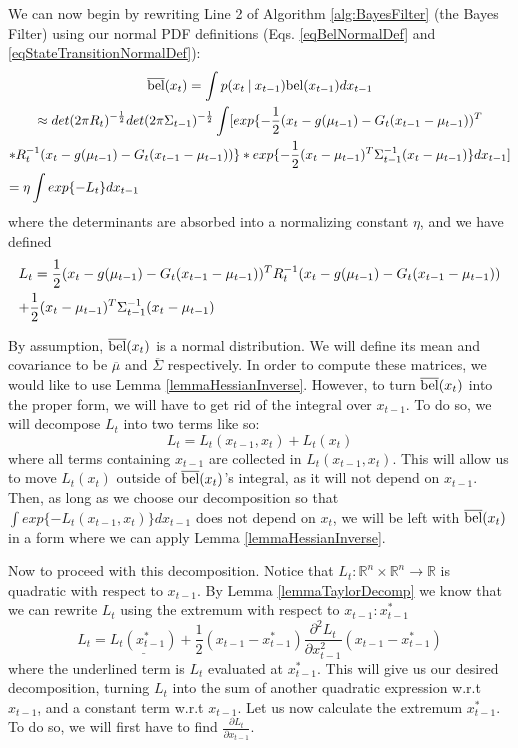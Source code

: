 We can now begin by rewriting Line 2 of Algorithm \ref{alg:BayesFilter} (the Bayes Filter) using our normal PDF definitions (Eqs. \ref{eqBelNormalDef} and \ref{eqStateTransitionNormalDef}):
\begin{multline} \label{eqBelBarLt}
\overline{\bel}(x_t) = \int p(x_t \mathbin{\vert} x_{t-1}) \bel(x_{t-1})dx_{t-1} \\
\approx det(2 \pi R_t)^{-\frac{1}{2}} det(2 \pi \Sigma_{t-1})^{-\frac{1}{2}} \int [ exp\{-\frac{1}{2} (x_t - g(\mu_{t-1}) - G_t (x_{t-1} - \mu_{t-1}))^T \\ * R_t^{-1} (x_t - g(\mu_{t-1}) - G_t (x_{t-1} - \mu_{t-1}))\} * exp \{-\frac{1}{2} (x_t - \mu_{t-1})^T \Sigma_{t-1}^{-1} (x_t - \mu_{t-1}) \}dx_{t-1} ] \\
= \eta \int exp\{-L_t\}dx_{t-1} \hfill
\end{multline}
where the determinants are absorbed into a normalizing constant \(\eta\), and we have defined
\begin{multline}
L_t = \frac{1}{2} (x_t - g(\mu_{t-1}) - G_t (x_{t-1} - \mu_{t-1}))^T R_t^{-1} (x_t - g(\mu_{t-1}) - G_t (x_{t-1} - \mu_{t-1}))\\
+ \frac{1}{2} (x_t - \mu_{t-1})^T \Sigma_{t-1}^{-1} (x_t - \mu_{t-1}) \hfill
\end{multline}

By assumption, \(\overline{\mathrm{bel}}(x_t)\) is a normal distribution. We will define its mean and covariance to be \(\overline{\mu}\) and \(\overline{\Sigma}\) respectively. In order to compute these matrices, we would like to use Lemma \ref{lemmaHessianInverse}. However, to turn \(\overline{\mathrm{bel}}(x_t)\) into the proper form, we will have to get rid of the integral over \(x_{t-1}\). To do so, we will decompose \(L_t\) into two terms like so: \begin{equation} \label{eqLtDecomp}
L_t = L_t(x_{t-1},x_t) + L_t(x_t)
\end{equation}
where all terms containing \(x_{t-1}\) are collected in \(L_t(x_{t-1},x_t)\). This will allow us to move \(L_t(x_t)\) outside of \(\overline{\mathrm{bel}}(x_t)\)'s integral, as it will not depend on \(x_{t-1}\). Then, as long as we choose our decomposition so that \(\int exp\{ -L_t(x_{t-1},x_t)\}dx_{t-1}\) does not depend on \(x_t\), we will be left with \(\overline{\mathrm{bel}}(x_t)\) in a form where we can apply Lemma \ref{lemmaHessianInverse}.

Now to proceed with this decomposition. Notice that \(L_t : \mathbb{R}^n \times \mathbb{R}^n \to \mathbb{R}\) is quadratic with respect to \(x_{t-1}\). By Lemma \ref{lemmaTaylorDecomp} we know that we can rewrite \(L_t\) using the extremum with respect to \(x_{t-1}: x_{t-1}^*\) \[
L_t = \underline{L_t(x_{t-1}^*)} + \frac{1}{2} (x_{t-1} - x_{t-1}^*) \frac{\partial^2 L_t}{\partial x_{t-1}^2} (x_{t-1} - x_{t-1}^*)
\] 
where the underlined term is \(L_t\) evaluated at \(x_{t-1}^*\). This will give us our desired decomposition, turning \(L_t\) into the sum of another quadratic expression w.r.t \(x_{t-1}\), and a constant term w.r.t \(x_{t-1}\). Let us now calculate the extremum \(x_{t-1}^*\). To do so, we will first have to find \(\frac{\partial L_t}{\partial x_{t-1}}\).

